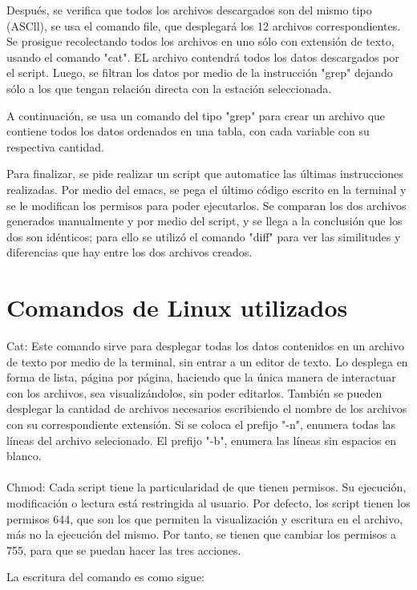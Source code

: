 \documentclass{article}
\begin{document}
Después, se verifica que todos los archivos descargados son del mismo tipo  (ASCll), se usa el comando file, que desplegará los 12 archivos correspondientes. Se prosigue recolectando todos los archivos en uno sólo con extensión de texto, usando el comando "cat". EL archivo contendrá todos los datos descargados por el script. Luego, se filtran los datos por medio de la instrucción "grep" dejando sólo a los que tengan relación directa con la estación seleccionada.

A continuación, se usa un comando del tipo "grep" para crear un archivo que contiene todos los datos ordenados en una tabla, con cada variable con su respectiva cantidad.

Para finalizar, se pide realizar un script que automatice las últimas instrucciones realizadas. Por medio del emacs, se pega el último código escrito en la terminal y se le modifican los permisos para poder ejecutarlos. Se comparan los dos archivos generados manualmente y por medio del script, y se llega a la conclusión que los dos son idénticos; para ello se utilizó el comando "diff" para ver las similitudes y diferencias que hay entre los dos archivos creados.

\section{Comandos de Linux utilizados}

Cat: Este comando sirve para desplegar todas los datos contenidos en un archivo de texto por medio de la terminal, sin entrar a un editor de texto. Lo desplega en forma de lista, página por página, haciendo que la única manera de interactuar con los archivos, sea visualizándolos, sin poder editarlos. También se pueden desplegar la cantidad de archivos necesarios escribiendo el nombre de los archivos con su correspondiente extensión. Si se coloca el prefijo "-n", enumera todas las líneas del archivo selecionado. El prefijo "-b", enumera las líneas sin espacios en blanco.
\\
\\
Chmod: Cada script tiene la particularidad de que tienen permisos. Su ejecución, modificación o lectura está restringida al usuario. Por defecto, los script tienen los permisos 644, que son los que permiten la visualización y escritura en el archivo, más no la ejecución del mismo. Por tanto, se tienen que cambiar los permisos a 755, para que se puedan hacer las tres acciones.

La escritura del comando es como sigue:
\end{document}

